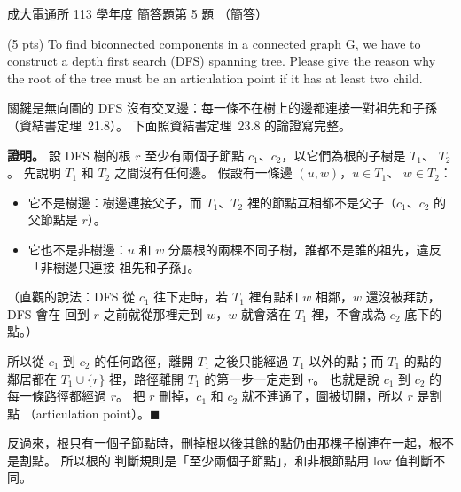 \begin{pastexam}[label={px:ncku-113-cce-14}]{成大電通所 113 學年度 簡答題第 5 題}
（簡答）

(5 pts) To find biconnected components in a connected graph G, we have to construct a depth
first search (DFS) spanning tree. Please give the reason why the root of the tree must be an
articulation point if it has at least two child.
\end{pastexam}

\begin{pastsoln}
關鍵是無向圖的 DFS 沒有交叉邊：每一條不在樹上的邊都連接一對祖先和子孫（資結書定理~21.8）。
下面照資結書定理~23.8 的論證寫完整。

\textbf{證明。} 設 DFS 樹的根 $r$ 至少有兩個子節點 $c_1$、$c_2$，以它們為根的子樹是 $T_1$、
$T_2$。 先說明 $T_1$ 和 $T_2$ 之間沒有任何邊。 假設有一條邊 $(u, w)$，$u \in T_1$、
$w \in T_2$：
\begin{itemize}
\item 它不是樹邊：樹邊連接父子，而 $T_1$、$T_2$ 裡的節點互相都不是父子（$c_1$、$c_2$ 的
父節點是 $r$）。
\item 它也不是非樹邊：$u$ 和 $w$ 分屬根的兩棵不同子樹，誰都不是誰的祖先，違反「非樹邊只連接
祖先和子孫」。
\end{itemize}
（直觀的說法：DFS 從 $c_1$ 往下走時，若 $T_1$ 裡有點和 $w$ 相鄰，$w$ 還沒被拜訪，DFS 會在
回到 $r$ 之前就從那裡走到 $w$，$w$ 就會落在 $T_1$ 裡，不會成為 $c_2$ 底下的點。）

所以從 $c_1$ 到 $c_2$ 的任何路徑，離開 $T_1$ 之後只能經過 $T_1$ 以外的點；而 $T_1$ 的點的
鄰居都在 $T_1 \cup \{r\}$ 裡，路徑離開 $T_1$ 的第一步一定走到 $r$。 也就是說 $c_1$ 到 $c_2$
的每一條路徑都經過 $r$。 把 $r$ 刪掉，$c_1$ 和 $c_2$ 就不連通了，圖被切開，所以 $r$ 是割點
（articulation point）。\hfill$\blacksquare$

反過來，根只有一個子節點時，刪掉根以後其餘的點仍由那棵子樹連在一起，根不是割點。 所以根的
判斷規則是「至少兩個子節點」，和非根節點用 low 值判斷不同。
\end{pastsoln}
